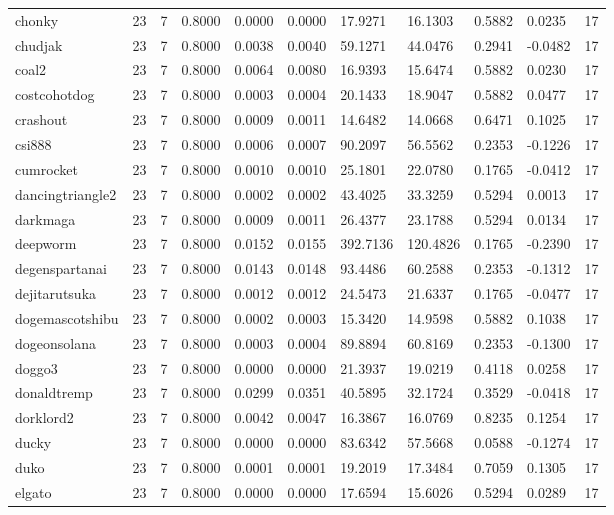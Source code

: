\begin{table}[htbp]
\begin{tabular}{lllllllllll}
chonky & 23 & 7 & 0.8000 & 0.0000 & 0.0000 & 17.9271 & 16.1303 & 0.5882 & 0.0235 & 17 \\
chudjak & 23 & 7 & 0.8000 & 0.0038 & 0.0040 & 59.1271 & 44.0476 & 0.2941 & -0.0482 & 17 \\
coal2 & 23 & 7 & 0.8000 & 0.0064 & 0.0080 & 16.9393 & 15.6474 & 0.5882 & 0.0230 & 17 \\
costcohotdog & 23 & 7 & 0.8000 & 0.0003 & 0.0004 & 20.1433 & 18.9047 & 0.5882 & 0.0477 & 17 \\
crashout & 23 & 7 & 0.8000 & 0.0009 & 0.0011 & 14.6482 & 14.0668 & 0.6471 & 0.1025 & 17 \\
csi888 & 23 & 7 & 0.8000 & 0.0006 & 0.0007 & 90.2097 & 56.5562 & 0.2353 & -0.1226 & 17 \\
cumrocket & 23 & 7 & 0.8000 & 0.0010 & 0.0010 & 25.1801 & 22.0780 & 0.1765 & -0.0412 & 17 \\
dancingtriangle2 & 23 & 7 & 0.8000 & 0.0002 & 0.0002 & 43.4025 & 33.3259 & 0.5294 & 0.0013 & 17 \\
darkmaga & 23 & 7 & 0.8000 & 0.0009 & 0.0011 & 26.4377 & 23.1788 & 0.5294 & 0.0134 & 17 \\
deepworm & 23 & 7 & 0.8000 & 0.0152 & 0.0155 & 392.7136 & 120.4826 & 0.1765 & -0.2390 & 17 \\
degenspartanai & 23 & 7 & 0.8000 & 0.0143 & 0.0148 & 93.4486 & 60.2588 & 0.2353 & -0.1312 & 17 \\
dejitarutsuka & 23 & 7 & 0.8000 & 0.0012 & 0.0012 & 24.5473 & 21.6337 & 0.1765 & -0.0477 & 17 \\
dogemascotshibu & 23 & 7 & 0.8000 & 0.0002 & 0.0003 & 15.3420 & 14.9598 & 0.5882 & 0.1038 & 17 \\
dogeonsolana & 23 & 7 & 0.8000 & 0.0003 & 0.0004 & 89.8894 & 60.8169 & 0.2353 & -0.1300 & 17 \\
doggo3 & 23 & 7 & 0.8000 & 0.0000 & 0.0000 & 21.3937 & 19.0219 & 0.4118 & 0.0258 & 17 \\
donaldtremp & 23 & 7 & 0.8000 & 0.0299 & 0.0351 & 40.5895 & 32.1724 & 0.3529 & -0.0418 & 17 \\
dorklord2 & 23 & 7 & 0.8000 & 0.0042 & 0.0047 & 16.3867 & 16.0769 & 0.8235 & 0.1254 & 17 \\
ducky & 23 & 7 & 0.8000 & 0.0000 & 0.0000 & 83.6342 & 57.5668 & 0.0588 & -0.1274 & 17 \\
duko & 23 & 7 & 0.8000 & 0.0001 & 0.0001 & 19.2019 & 17.3484 & 0.7059 & 0.1305 & 17 \\
elgato & 23 & 7 & 0.8000 & 0.0000 & 0.0000 & 17.6594 & 15.6026 & 0.5294 & 0.0289 & 17 \\

\end{tabular}
\end{table}
